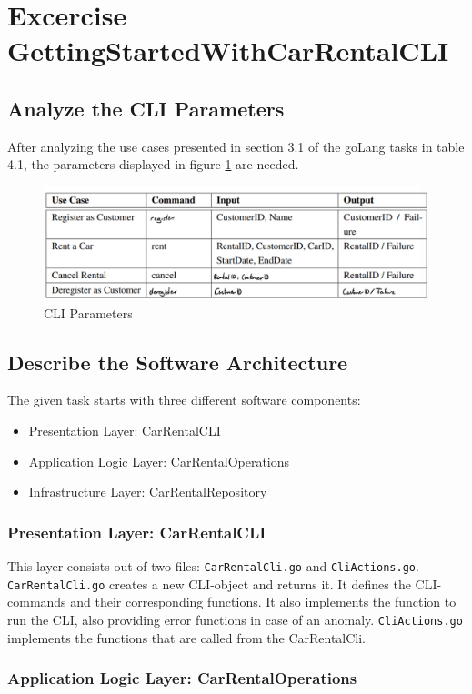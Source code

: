 \section{Excercise GettingStartedWithCarRentalCLI}
\subsection*{Analyze the CLI Parameters}
After analyzing the use cases presented in section 3.1 of the goLang tasks in table 4.1, the parameters displayed in figure \ref{fig:car_rental_cli_parameters} are needed.

\begin{figure}[H]
    \centering
    \includegraphics[width=\textwidth]{figures/goLang/carRental/carRental_CLIParameters.png}
    \caption{CLI Parameters}
    \label{fig:car_rental_cli_parameters}
\end{figure}

\subsection*{Describe the Software Architecture}
The given task starts with three different software components:
\begin{itemize}
    \item Presentation Layer: CarRentalCLI
    \item Application Logic Layer: CarRentalOperations
    \item Infrastructure Layer: CarRentalRepository
\end{itemize}
\subsubsection*{Presentation Layer: CarRentalCLI}
This layer consists out of two files: \texttt{CarRentalCli.go} and \texttt{CliActions.go}.
\texttt{CarRentalCli.go} creates a new CLI-object and returns it.
It defines the CLI-commands and their corresponding functions.
It also implements the function to run the CLI, also providing error functions in case of an anomaly.
\texttt{CliActions.go} implements the functions that are called from the CarRentalCli.

\subsubsection*{Application Logic Layer: CarRentalOperations}

